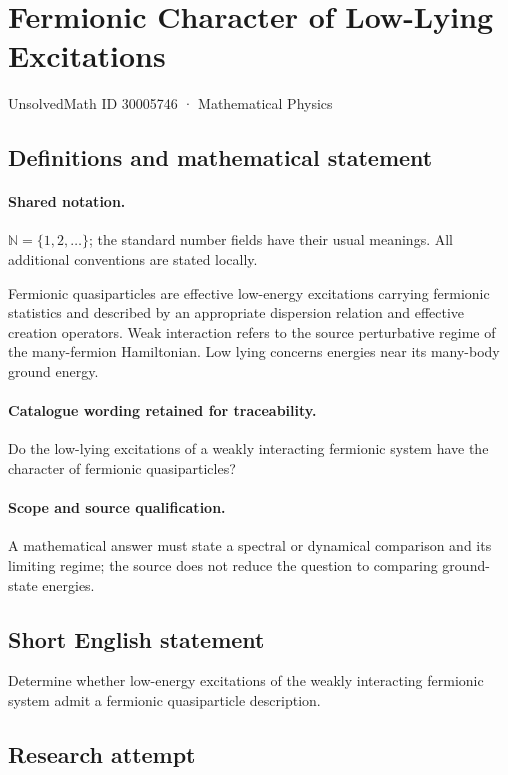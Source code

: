 \documentclass[11pt]{article}
\begin{document}
\setcounter{section}{30005745}
\section{Fermionic Character of Low-Lying Excitations}\label{30005746}
{\small UnsolvedMath ID 30005746 · Mathematical Physics}
\subsection{Definitions and mathematical statement}

\paragraph{Shared notation.}$\mathbb N=\{1,2,\ldots\}$; the standard number fields have their usual meanings. All additional conventions are stated locally.


Fermionic quasiparticles are effective low-energy excitations carrying fermionic statistics and described by an appropriate dispersion relation and effective creation operators. Weak interaction refers to the source perturbative regime of the many-fermion Hamiltonian. Low lying concerns energies near its many-body ground energy.

\paragraph{Catalogue wording retained for traceability.}
Do the low-lying excitations of a weakly interacting fermionic system have the character of fermionic quasiparticles?

\paragraph{Scope and source qualification.}A mathematical answer must state a spectral or dynamical comparison and its limiting regime; the source does not reduce the question to comparing ground-state energies.
\subsection{Short English statement}
Determine whether low-energy excitations of the weakly interacting fermionic system admit a fermionic quasiparticle description.
\subsection{Research attempt}
\end{document}
